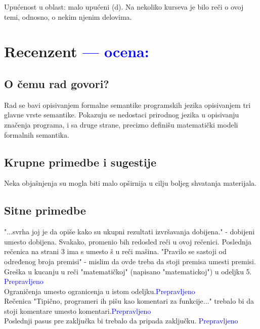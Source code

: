 \documentclass[a4paper]{report}
\newcommand{\odgovor}[1]{\textcolor{blue}{#1}}
\begin{document}
{Upućenost u oblast: malo upućeni (d). Na nekoliko kurseva je bilo reči o ovoj temi, odnosno, o nekim njenim delovima.}

\chapter{Recenzent \odgovor{--- ocena:}}

\section{O čemu rad govori?}
Rad se bavi opisivanjem formalne semantike programskih jezika opisivanjem tri glavne vrste semantike. Pokazuju se nedostaci prirodnog jezika u opisivanju značenja programa, i sa druge strane, precizno definišu matematički modeli formalnih semantika.

\section{Krupne primedbe i sugestije}
Neka objašnjenja su mogla biti malo opširnija u cilju  boljeg shvatanja materijala.

\section{Sitne primedbe}
"...svrha joj je da opiše kako su ukupni rezultati izvršavanja dobijena." - dobijeni umesto dobijena. Svakako, promenio bih redosled reči u ovoj rečenici. Poslednja rečenica na strani 3 ima s umesto š u reči mašina. "Pravilo se sastoji od određenog broja premisi" - mislim da ovde treba da stoji premisa umesti premisi.\\ Greška u kucanju u reči "matematičkoj" (napisano "matematickoj") u odeljku 5. \odgovor{Prepravljeno}\\ Ograničenja umesto ogranicenja u istom odeljku.\odgovor{Prepravljeno}\\ Rečenica "Tipično, programeri ih pišu kao komentari za funkcije..." trebalo bi da stoji komentare umesto komentari.\odgovor{Prepravljeno}\\ Poslednji pasus pre zaključka bi trebalo da pripada zaključku. \odgovor{Prepravljeno}
\end{document}
